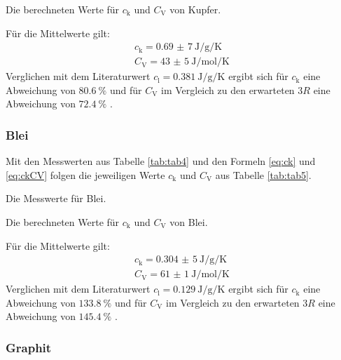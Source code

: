 \begin{table}
	\centering
	\caption{Die berechneten Werte für $c_\text{k}$ und $C_\text{V}$ von Kupfer.}
	
	\label{tab:tab3}
\end{table}

Für die Mittelwerte gilt:
\begin{align*}
	c_\text{k} = \SI{0,69(7)}{\joule\per\gram\per\kelvin} \\
	C_\text{V} = \SI{43(5)}{\joule\per\mol\per\kelvin}
\end{align*}
Verglichen mit dem Literaturwert $c_\text{l}=\SI{0,381}{\joule\per\gram\per\kelvin}$ \cite{clit} ergibt sich für $c_\text{k}$ eine Abweichung von $\SI{80,6}{\percent}$ und für $C_\text{V}$ im Vergleich zu den erwarteten $3R$ eine Abweichung von $\SI{72,4}{\percent}$ .

\subsubsection{Blei}

Mit den Messwerten aus Tabelle \ref{tab:tab4} und den Formeln \eqref{eq:ck} und \eqref{eq:ckCV} folgen die jeweiligen Werte $c_\text{k}$ und $C_\text{V}$ aus Tabelle \ref{tab:tab5}.\\
\begin{table}
	\centering
	\caption{Die Messwerte für Blei.}
	
	\label{tab:tab4}
\end{table}

\begin{table}
	\centering
	\caption{Die berechneten Werte für $c_\text{k}$ und $C_\text{V}$ von Blei.}
	
	\label{tab:tab5}
\end{table}

Für die Mittelwerte gilt:
\begin{align*}
	c_\text{k} = \SI{0,304(5)}{\joule\per\gram\per\kelvin}\\
	C_\text{V} = \SI{61(1)}{\joule\per\mol\per\kelvin}
\end{align*}
Verglichen mit dem Literaturwert $c_\text{l}=\SI{0,129}{\joule\per\gram\per\kelvin}$ \cite{clit} ergibt sich für $c_\text{k}$ eine Abweichung von $\SI{133,8}{\percent}$ und für $C_\text{V}$ im Vergleich zu den erwarteten $3R$ eine Abweichung von $\SI{145,4}{\percent}$ .

\subsubsection{Graphit}

